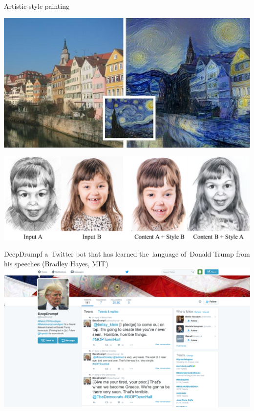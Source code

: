 \documentclass{beamer}
\begin{document}
  {
    \begin{frame}{Artistic-style painting}
      \begin{center}
        \includegraphics[height=.4\textheight]{../img/art_Van_Gogh.jpg}
        \pause

        \includegraphics[height=.44\textheight]{../img/art_girl.png}
      \end{center}
    \end{frame}
  }

  {
    \begin{frame}{DeepDrumpf}
      a~Twitter bot that has learned the~language of~Donald Trump from his speeches
      (Bradley Hayes, MIT)
      \includegraphics[width=\textwidth]{../img/DeepDrumpf.png}
    \end{frame}
  }
\end{document}
